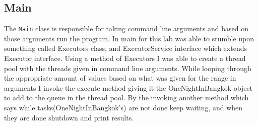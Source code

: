 \documentclass{article}
\begin{document}
\subsection{Main}
The \texttt{Main} class is responsible for taking command line arguments and based on those arguments run the program. In main for this lab was able to stumble upon something called Executors class, and ExecutorService interface which extends Executor interface. Using a method of Executors I was able to create a thread pool with the threads given in command line arguments. While looping through the appropriate amount of values based on what was given for the range in arguments I invoke the execute method giving it the OneNightInBangkok object to add to the queue in the thread pool. By the invoking another method which says while tasks(OneNightInBangkok's) are not done keep waiting, and when they are done shutdown and print results. 
\end{document}
